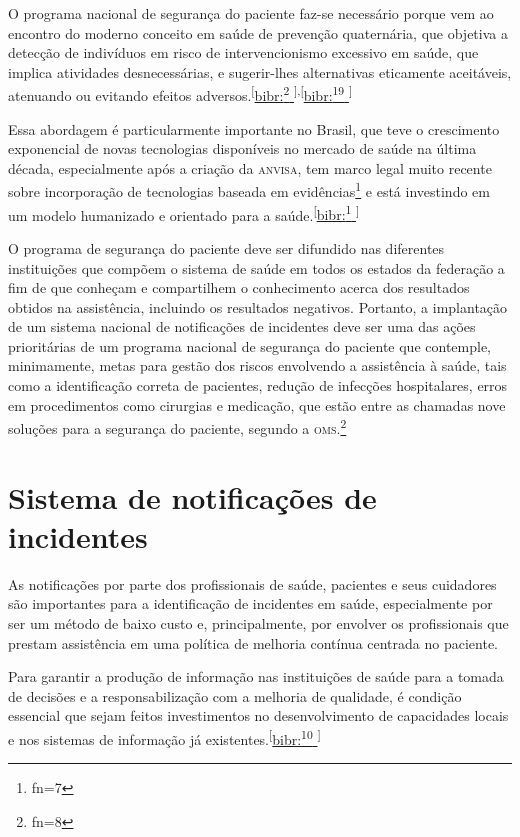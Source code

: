 \documentclass{article}
\makeatletter
\newcommand{\fn}{\afterassignment\fn@aux\count0=}
\newcommand{\fn@aux}{\csname fn\the\count0\endcsname}
\makeatother
\begin{document}
O programa nacional de segurança do paciente faz-se necessário porque vem ao
encontro do
moderno conceito em saúde de prevenção quaternária, que objetiva a detecção de
indivíduos em
risco de intervencionismo excessivo em saúde, que implica atividades
desnecessárias, e
sugerir-lhes alternativas eticamente aceitáveis, atenuando ou evitando efeitos
adversos.\textsuperscript{[}\hyperlink{\textsuperscript{2}
}{bibr:\textsuperscript{2}
}\textsuperscript{]}\textsuperscript{,}\textsuperscript{[}\hyperlink{\textsuperscript{19}
}{bibr:\textsuperscript{19}
}\textsuperscript{]}

Essa abordagem é particularmente importante no Brasil, que teve o crescimento
exponencial
de novas tecnologias disponíveis no mercado de saúde na última década,
especialmente após a
criação da \textsc{anvisa}, tem marco legal muito recente sobre incorporação de
tecnologias baseada
em evidências\footnote{\fn7}
e está investindo em um modelo humanizado e orientado para a saúde.\textsuperscript{[}\hyperlink{\textsuperscript{1}
}{bibr:\textsuperscript{1}
}\textsuperscript{]}

O programa de segurança do paciente deve ser difundido nas diferentes
instituições que
compõem o sistema de saúde em todos os estados da federação a fim de que
conheçam e
compartilhem o conhecimento acerca dos resultados obtidos na assistência,
incluindo os
resultados negativos. Portanto, a implantação de um sistema nacional de
notificações de
incidentes deve ser uma das ações prioritárias de um programa nacional de
segurança do
paciente que contemple, minimamente, metas para gestão dos riscos envolvendo a
assistência à
saúde, tais como a identificação correta de pacientes, redução de infecções
hospitalares,
erros em procedimentos como cirurgias e medicação, que estão entre as chamadas
nove soluções
para a segurança do paciente, segundo a \textsc{oms}.\footnote{\fn8}

\section{Sistema de notificações de incidentes}

As notificações por parte dos profissionais de saúde, pacientes e seus
cuidadores são
importantes para a identificação de incidentes em saúde, especialmente por ser
um método de
baixo custo e, principalmente, por envolver os profissionais que prestam
assistência em uma
política de melhoria contínua centrada no paciente.

Para garantir a produção de informação nas instituições de saúde para a tomada
de decisões
e a responsabilização com a melhoria de qualidade, é condição essencial que
sejam feitos
investimentos no desenvolvimento de capacidades locais e nos sistemas de
informação já
existentes.\textsuperscript{[}\hyperlink{\textsuperscript{10}
}{bibr:\textsuperscript{10}
}\textsuperscript{]}
\end{document}
